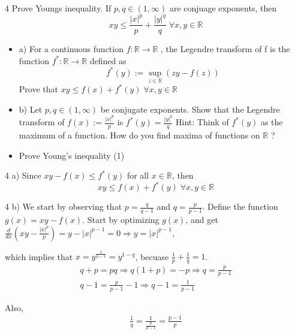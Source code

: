 \documentclass[a4paper,norsk]{article}
\renewcommand{\leq}{\leqslant}
\begin{document}
\begin{oppgavebox}{4}{}
Prove Youngs inequality. If $ p, q \in \left( 1, \infty \right)  $ are conjuage exponents, then 
\[
    xy \leq \frac{ \left| x \right| ^{p}  }{ p } + \frac{ \left| y \right| ^{q}  }{ q } \; \forall x, y \in \mathbb{R}
\]

\begin{itemize}
  \item a) For a continuous function $ f : \mathbb{R} \to \mathbb{R} $ , the Legendre transform of f is the function $ f^* : \mathbb{R} \to \mathbb{R}     $ defined as  
  \[
    f ^{*} (y) := \sup _{z \in \mathbb{R}}  \left( zy - f(z) \right) 
  \]
  Prove that  $ xy \leq f(x) + f^* (y) \; \forall x, y \in \mathbb{R} $ 
  \item b) Let $p, q \in  \left( 1, \infty \right)$  be conjugate exponents. Show that the Legendre transform of $f(x) := \frac{ \left| x \right| ^{p} }{ p } $ is $ f^* (y) = \frac{ \left| y \right| ^{q}  }{ q } $ 
  Hint: Think of $ f^* (y) $  as the maximum of a function. How do you find maxima of functions on $ \mathbb{R} $ ?
  \item Prove Young’s inequality (1)
\end{itemize}


\begin{proofbox}{4 a)}{}
  Since $ xy - f(x) \leq f ^{*}(y)  $ for all $ x \in \mathbb{R} $, then 
  \[
      xy \leq f(x) + f ^{*}(y) \; \forall x, y \in \mathbb{R} 
  \]
  
\end{proofbox}

\begin{proofbox}{4 b)}{}
  We start by observing that $ p = \frac{ q }{ q-1 } $ and $ q = \frac{ p }{ p-1 } $. Define the function $ g(x) = xy - f(x) $.  Start by optimizing $ g(x) $, and get $ \frac{ d }{ dx } \left( xy - \frac{ \left| x \right| ^{p}  }{ p } \right) = y - \left| x \right| ^{p-1}  = 0 \Rightarrow y = \left| x \right| ^{p-1} $, 
  
  
  
  which implies that $ x = y ^{ \frac{ 1 }{ p-1 }} = y ^{1-q}   $, becuase $ \frac{ 1 }{ p } + \frac{ 1 }{ q } = 1 $. 
  \begin{align*}
    q + p = pq \Rightarrow q \left( 1+p \right) = -p \Rightarrow q = \frac{ p }{ p-1 }\\
    q - 1 = \frac{ p }{ p-1 } - 1 \Rightarrow q-1 = \frac{ 1 }{ p-1 }
  \end{align*}

  Also,
  \begin{align*}
    \frac{ 1 }{ q } = \frac{ 1 }{ \frac{ p }{ p-1 } } = \frac{ p-1 }{ p }
  \end{align*}
  

\end{proofbox}
\end{oppgavebox}
\end{document}
